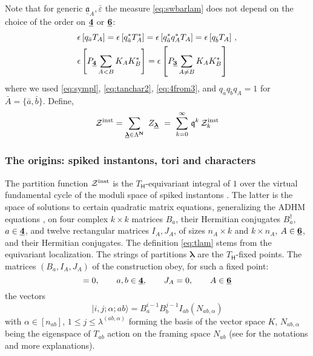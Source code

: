 \documentclass[12pt]{amsart}
\newcommand {\3}{\underline{\bf 3}}
\newcommand {\4}{\underline{\bf 4}}
\newcommand {\6}{\underline{\bf 6}}
\newcommand{\beq}{\begin{equation}}
\newcommand{\eeq}{\end{equation}}
\newcommand {\bN}   {\mathbf{N}}
\newcommand {\qe} {\mathfrak q}
\newcommand {\Hf} {\mathsf{H}}
\newcommand {\ba}  {\underline{\ac}}
\newcommand {\bla} {\underline{\boldsymbol{\lambda}}}
\newcommand {\ac} {\mathfrak{a}}
\newcommand {\CalZ} {\mathcal Z}
\newcommand{\ve}{\varepsilon}
\newcommand{\ep}{\epsilon}
\begin{document}
Note that for generic ${\ba}_{A}, {\bar\ve}$ the measure \eqref{eq:swbarlam}
does not depend on the choice of the order on $\4$ or $\6$:
\beq
\begin{aligned}
& {\ep} \left[ q_{\bar a} T_{A} \right] = {\ep} \left[ 
q_{\bar a}^{*} T_{A}^{*} \right] = {\ep} \left[ 
q_{\bar a}^{*} q_{A}^{*} T_{A} \right]  = {\ep} \left[ 
q_{\bar b} T_{A} \right] \, , \\
& {\ep} \left[ P_{\4} \sum_{A < B} K_{A}K_{B}^{*} \right] = {\ep} \left[ P_{\3} \sum_{A \neq B} K_{A}K_{B}^{*} \right] \\
\end{aligned}
\eeq
where we used \eqref{eq:sympl}, \eqref{eq:tanchar2}, \eqref{eq:4from3}, and $q_{\bar a} q_{\bar b}q_{A} = 1$ for ${\bar A} = \{ {\bar a}, {\bar b} \}$. 
Define, 
\beq
{\CalZ}^{\rm inst} = \sum\limits_{{\bla} \in {\Lambda}^{\bN}} \ Z_{\bla} \  = \ \sum_{k=0}^{\infty}\, {\qe}^{k} \, {\CalZ}^{\rm inst}_{k}
\label{eq:swzk}
\eeq
\subsubsection{The origins: spiked instantons, tori and characters} 


The partition function ${\CalZ}^{\rm inst}$ is the $T_{\Hf}$-equivariant 
integral of $1$ over the virtual fundamental cycle of the moduli space
of spiked instantons \cite{Nekrasov:2016qym}. 
The latter is the space of solutions to certain quadratic matrix equations, generalizing the ADHM equations \cite{Atiyah:1978ri}, on four complex $k \times k$ matrices $B_{a}$, their Hermitian conjugates $B_{a}^{\dagger}$, $a \in \4$, and twelve rectangular matrices $I_{A}, J_{A}$, of sizes $n_{A} \times k$ and $k \times n_{A}$, $A \in \6$, and their Hermitian conjugates. 
The definition \eqref{eq:tlam} stems from the equivariant localization. 
The strings of partitions $\bla$ are the 
$T_{\Hf}$-fixed points. The matrices $(B_{a}, I_A, J_A)$ of the
construction \cite{Nekrasov:2016qym} obey, for such a fixed point:
\beq
[ B_{a}, B_{b} ] =0, \qquad a, b \in {\4}, \qquad J_A = 0, \qquad A \in {\6}
\eeq
the vectors
\beq
| i,j ; {\alpha} ; ab \rangle = 
B_{a}^{i-1}B_{b}^{j-1} I_{ab} (N_{ab, {\alpha}}) 
\eeq
with ${\alpha} \in [n_{ab}]$, $1 \leq j \leq {\lambda}^{(ab, {\alpha})}$
forming the basis of the vector space $K$, $N_{ab, {\alpha}}$
being the eigenspace of $T_{ab}$ action on the framing space 
$N_{ab}$ (see \cite{Nekrasov:2016qym} for the notations and more explanations). 
  
\end{document}
